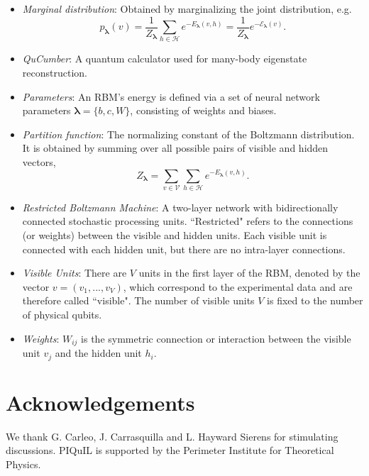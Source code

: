 \documentclass[submission, Phys]{SciPost}
\begin{document}
\begin{itemize}
\item {\it Marginal distribution}:  Obtained by marginalizing the joint distribution, e.g.
\begin{equation}
\label{Eq:marginal_distribution}
    p_{\bm{\lambda}}(v) = \frac{1}{Z_{\bm{\lambda}}} \sum\limits_{h\in \mathcal{H}} e^{-E_{\bm{\lambda}}(v,h)} = \frac{1}{Z_{\bm{\lambda}}} e^{- \mathcal{E}_{\bm{\lambda}}(v)}.
\end{equation}

\item {\it QuCumber}: A quantum calculator used for many-body eigenstate reconstruction.

\item {\it Parameters}:  An RBM's energy is defined via a set of neural network parameters $\bm{\lambda} = \{b,c,W\}$, consisting of weights and biases.

\item {\it Partition function}: The normalizing constant of the Boltzmann distribution.  It is obtained by summing over all possible pairs of visible and hidden vectors,
\begin{equation}
    Z_{\bm{\lambda}} = \sum\limits_{v\in \mathcal{V}}\sum\limits_{h\in \mathcal{H}} e^{-E_{\bm{\lambda}}(v,h)}.
\end{equation}

\item {\it Restricted Boltzmann Machine}:  A two-layer network with bidirectionally connected stochastic processing units.  ``Restricted" refers to the connections (or weights) between the visible and hidden units. Each visible unit is connected with each hidden unit, but there are no intra-layer connections.

\item {\it Visible Units}:  There are $V$ units in the first layer of the RBM, denoted by the vector $v=(v_1, ..., v_V)$, which correspond to the experimental data and are therefore called ``visible".  The number of visible units $V$ is fixed to the number of physical qubits.

\item {\it Weights}:  $W_{ij}$ is the symmetric connection or interaction between the visible unit $v_j$ and the hidden unit $h_i$.

\end{itemize}


\section*{Acknowledgements}
We thank G. Carleo, J. Carrasquilla and L. Hayward Sierens for stimulating discussions. 
PIQuIL is supported by the Perimeter Institute for Theoretical Physics.
\end{document}
